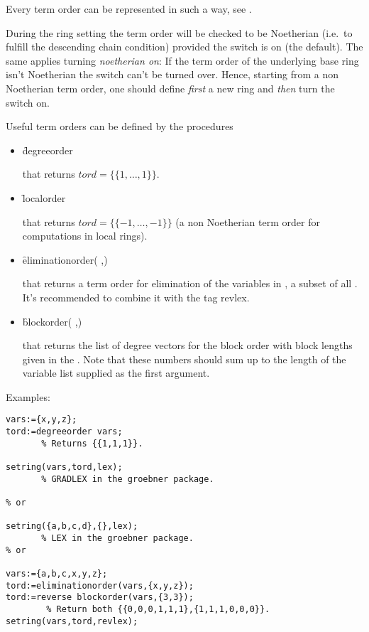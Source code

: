 Every term order can be represented in such a way, see \cite{Mora:88}.

During the ring setting the term order will be checked to be
Noetherian (i.e.\ to fulfill the descending chain condition) provided
the switch  is on (the default). The same applies
turning \emph{noetherian on}: If the term order of the underlying
base ring isn't Noetherian the switch can't be turned over. Hence,
starting from a non Noetherian term order, one should define
\emph{first} a new ring and \emph{then} turn the switch on.

Useful term orders can be defined by the procedures
\begin{itemize}
\item []
\begin{syntax}
  \f{degreeorder} 
\end{syntax}
that returns $tord=\{\{1,\ldots ,1\}\}$.

\item []
\begin{syntax}
  \f{localorder} 
\end{syntax}
that returns $tord=\{\{-1,\ldots ,-1\}\}$ (a non Noetherian term
order for computations in local rings).

\item[]
\begin{syntax}
 \f{eliminationorder}( ,)
\end{syntax}
that returns a term order for elimination of the variables in
, a subset of all . It's recommended to
combine it with the tag revlex.

\item[]
\begin{syntax}
 \f{blockorder}( ,)
\end{syntax}
that returns the list of degree vectors for the block order with
block lengths given in the . Note that these numbers
should sum up to the length of the variable list supplied as the first
argument.
\end{itemize}

\noindent Examples:
\begin{verbatim}
vars:={x,y,z};
tord:=degreeorder vars;
       % Returns {{1,1,1}}.

setring(vars,tord,lex);
       % GRADLEX in the groebner package.

% or

setring({a,b,c,d},{},lex);
       % LEX in the groebner package.
% or

vars:={a,b,c,x,y,z};
tord:=eliminationorder(vars,{x,y,z});
tord:=reverse blockorder(vars,{3,3});
        % Return both {{0,0,0,1,1,1},{1,1,1,0,0,0}}.
setring(vars,tord,revlex);
\end{verbatim}


